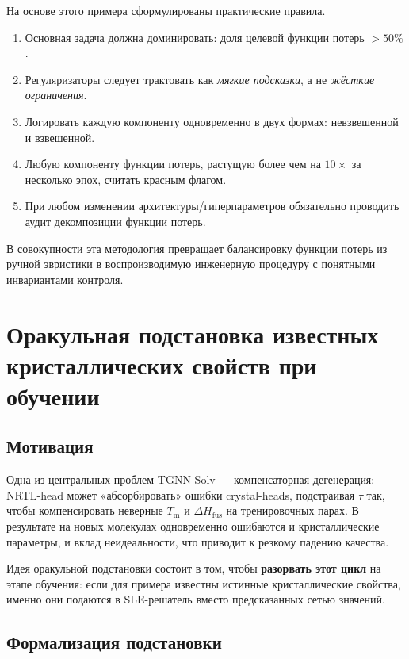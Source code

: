 \documentclass[11pt]{article}
\begin{document}
На основе этого примера сформулированы практические правила.

\begin{enumerate}
  \item Основная задача должна доминировать: доля целевой функции потерь $>50\%$.
  \item Регуляризаторы следует трактовать как \textit{мягкие подсказки}, а не \textit{жёсткие ограничения}.
  \item Логировать каждую компоненту одновременно в двух формах: невзвешенной и взвешенной.
  \item Любую компоненту функции потерь, растущую более чем на $10\times$ за несколько эпох, считать красным флагом.
  \item При любом изменении архитектуры/гиперпараметров обязательно проводить аудит декомпозиции функции потерь.
\end{enumerate}

В совокупности эта методология превращает балансировку функции потерь из ручной эвристики в воспроизводимую инженерную процедуру с понятными инвариантами контроля.

\section{Оракульная подстановка известных кристаллических свойств при обучении}
\label{sec:oracle-teacher-forcing}

\subsection{Мотивация}

Одна из центральных проблем TGNN-Solv --- компенсаторная дегенерация: NRTL-head может «абсорбировать» ошибки crystal-heads, подстраивая $\tau$ так, чтобы компенсировать неверные $T_{\mathrm{m}}$ и $\Delta H_{\mathrm{fus}}$ на тренировочных парах. В результате на новых молекулах одновременно ошибаются и кристаллические параметры, и вклад неидеальности, что приводит к резкому падению качества.

Идея оракульной подстановки состоит в том, чтобы \textbf{разорвать этот цикл} на этапе обучения: если для примера известны истинные кристаллические свойства, именно они подаются в SLE-решатель вместо предсказанных сетью значений.

\subsection{Формализация подстановки}
\end{document}
